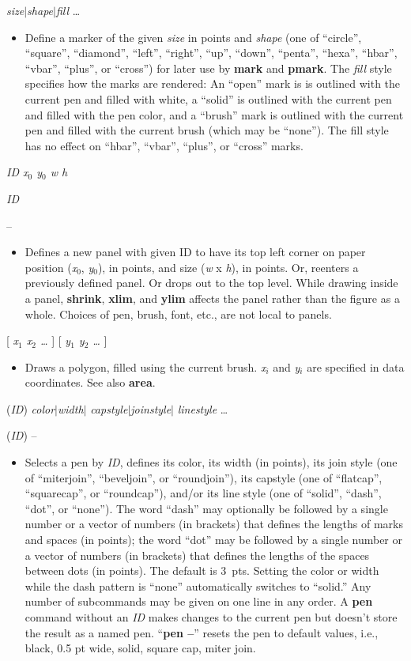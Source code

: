 \documentclass[11pt]{article}
\def\cmd#1#2{\noindent {\bf #1} #2\par}
\def\expl#1{\kern-8pt\begin{itemize}\item[]#1\end{itemize}}
\def\cref#1{{\bf #1}}
\def\bar{{$|$}}
\begin{document}
\cmd{marker}{\emph{size}\bar\emph{shape}\bar\emph{fill} \ldots}
\expl{Define a marker of the given \emph{size} in points and \emph{shape}
  (one of
  ``circle'', ``square'', ``diamond'', ``left'', ``right'', ``up'',
  ``down'', ``penta'', ``hexa'', ``hbar'', ``vbar'', ``plus'', or ``cross'')
  for
  later use by \cref{mark} and \cref{pmark}. The \emph{fill} style
  specifies how the marks are rendered: An ``open'' mark  is 
  is outlined with the current pen and filled with white,  a ``solid'' is
  outlined with the current pen and filled with the pen color, and a  ``brush'' mark is outlined  with
  the current pen and filled with the current brush (which may be ``none''). The fill style
  has no effect on ``hbar'', ``vbar'', ``plus'', or ``cross'' marks.}

\cmd{panel}{\emph{ID x$_0$ y$_0$ w h}}
\cmd{panel}{\emph{ID}}
\cmd{panel}{--}
\expl{Defines a new panel with given ID to have its top left corner on
  paper position (\emph{x$_0$}, \emph{y$_0$}), in points, and size
  (\emph{w} x \emph{h}), in points. Or, reenters a previously defined
  panel. Or drops out to the top level. While drawing inside a panel,
  \cref{shrink}, \cref{xlim}, and \cref{ylim} 
  affects the panel rather than the figure as a whole.
  Choices of pen, brush, font, etc., are not local to panels.}

\cmd{patch}{[ \emph{x$_1$ x$_2$ \ldots} ] [ \emph{y$_1$ y$_2$ \ldots} ]}
\expl{Draws a polygon, filled using the current brush. \emph{x$_i$}
  and \emph{y$_i$} are specified in data coordinates. See also \cref{area}.}

\cmd{pen}{(\emph{ID})
  \emph{color}\bar{}\emph{width}\bar{}%
  \emph{capstyle}\bar{}\emph{joinstyle}\bar{}%
  \emph{linestyle} \ldots}
\cmd{pen}{(\emph{ID}) --}

\expl{Selects a pen by \emph{ID}, defines its color, its width (in
  points), its join style (one of ``miterjoin'', ``beveljoin'', or ``roundjoin''),
  its capstyle (one of ``flatcap'', ``squarecap'', or ``roundcap''), and/or its
  line style (one of ``solid'', ``dash'', ``dot'', or ``none'').
The word ``dash'' may optionally be followed by a single number or a
vector of numbers (in brackets) that defines the lengths of marks and
spaces (in points); the word ``dot'' may be followed by a single
number or a vector of numbers (in brackets) that defines the lengths
of the spaces between dots (in points). The default is
3~pts.
  Setting the color or width while the dash pattern is
  ``none'' automatically switches to ``solid.'' Any number of
  subcommands may be given on one line in any order. A \cref{pen}
  command without an \emph{ID} makes changes to the current pen but
  doesn't store the result as a named pen. ``\cref{pen --}'' resets the
  pen to default values, i.e., black, 0.5 pt wide, solid, square cap,
  miter join.}
\end{document}
